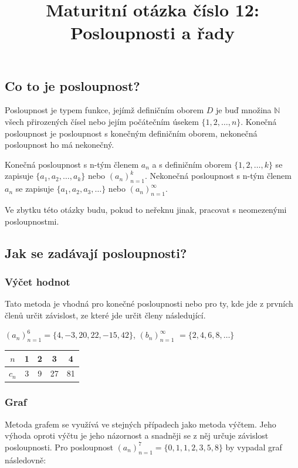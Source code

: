 \documentclass[12pt]{article}
\title{Maturitní otázka číslo 12: Posloupnosti a řady}
\author{}
\date{}
\begin{document}
\maketitle
\subsection*{Co to je posloupnost?}
Posloupnost je typem funkce, jejímž definičním oborem $D$ je buď množina $\mathbb{N}$ všech
přirozených čísel nebo jejím počátečním úsekem $\{1, 2, \dots, n\}$. Konečná posloupnost je
posloupnost s konečným definičním oborem, nekonečná posloupnost ho má nekonečný.

Konečná posloupnost s n-tým členem $a_n$ a s definičním oborem $\{1, 2, \dots, k\}$ se zapisuje
$\{a_1, a_2, \dots, a_k\}$ nebo $(a_n)_{n=1}^k$. Nekonečná posloupnost s n-tým členem $a_n$
se zapisuje $\{a_1, a_2, a_3, \dots\}$ nebo $(a_n)_{n=1}^\infty$.

Ve zbytku této otázky budu, pokud to neřeknu jinak, pracovat s neomezenými posloupnostmi.

\subsection*{Jak se zadávají posloupnosti?}
\subsubsection*{Výčet hodnot}
Tato metoda je vhodná pro konečné posloupnosti nebo pro ty, kde jde z prvních členů určit závislost,
ze které jde určit členy následující.

$(a_n)_{n=1}^6 = \{4, -3, 20, 22, -15, 42\}$, $(b_n)_{n=1}^\infty$ $= \{2, 4, 6, 8, \dots\}$

\begin{tabular}{|c|c|c|c|c|}
\hline
$n$   & 1 & 2 & 3  & 4 \\ \hline
$c_n$ & 3 & 9 & 27 & 81 \\ \hline
\end{tabular}
\subsubsection*{Graf}
Metoda grafem se využívá ve stejných případech jako metoda výčtem. Jeho výhoda oproti výčtu je jeho
názornost a snadněji se z něj určuje závislost posloupnosti. Pro posloupnost
$(a_n)_{n=1}^7 = \{0, 1, 1, 2, 3, 5, 8\}$ by vypadal graf následovně:
\begin{center}
\end{center}
\end{document}
